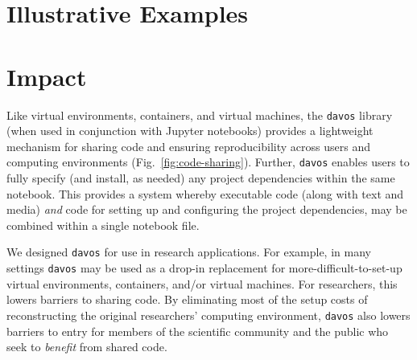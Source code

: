 \documentclass[preprint,12pt,a4paper]{elsarticle}
\begin{document}
\section{Illustrative Examples}



\section{Impact}

Like virtual environments, containers, and virtual machines, the
\texttt{davos} library (when used in conjunction with Jupyter
notebooks) provides a lightweight mechanism for sharing code and
ensuring reproducibility across users and computing environments
(Fig.~\ref{fig:code-sharing}). Further, \texttt{davos} enables users
to fully specify (and install, as needed) any project dependencies
within the same notebook. This provides a system whereby executable
code (along with text and media) \textit{and} code for setting up and
configuring the project dependencies, may be combined within a single
notebook file.

We designed \texttt{davos} for use in research applications. For
example, in many settings \texttt{davos} may be used as a drop-in
replacement for more-difficult-to-set-up virtual environments,
containers, and/or virtual machines. For researchers, this lowers
barriers to sharing code. By eliminating most of the setup costs
of reconstructing the original researchers' computing environment,
\texttt{davos} also lowers barriers to entry for members of
the scientific community and the public who seek to \textit{benefit}
from shared code.
\end{document}
